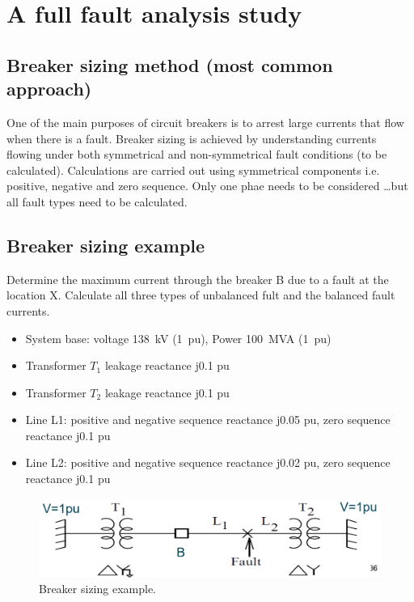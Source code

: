 \documentclass[class=report, crop=false, 12pt,a4paper]{standalone}
\begin{document}
\section{A full fault analysis study}
\subsection{Breaker sizing method (most common approach)}
One of the main purposes of circuit breakers is to arrest large currents that flow when there is a fault. Breaker sizing is achieved by understanding currents flowing under both symmetrical and non-symmetrical fault conditions (to be calculated). Calculations are carried out using symmetrical components i.e. positive, negative and zero sequence. Only one phae needs to be considered \dots but all fault types need to be calculated.
\subsection{Breaker sizing example}
Determine the maximum current through the breaker B due to a fault at the location X. Calculate all three types of unbalanced fult and the balanced fault currents. 
\begin{itemize}
	\item System base: voltage \SI{138}{kV} (\SI{1}{pu}), Power \SI{100}{MVA} (\SI{1}{pu})
	\item Transformer $T_1$ leakage reactance j0.1 pu
	\item Transformer $T_2$ leakage reactance j0.1 pu
	\item Line L1: positive and negative sequence reactance j0.05 pu, zero sequence reactance j0.1 pu
	\item Line L2: positive and negative sequence reactance j0.02 pu, zero sequence reactance j0.1 pu
\end{itemize}
\begin{figure}[H]
	\centering
	\includegraphics[width = \textwidth]{../img/figure39.png}
	\caption{Breaker sizing example.}
\end{figure}
\end{document}

